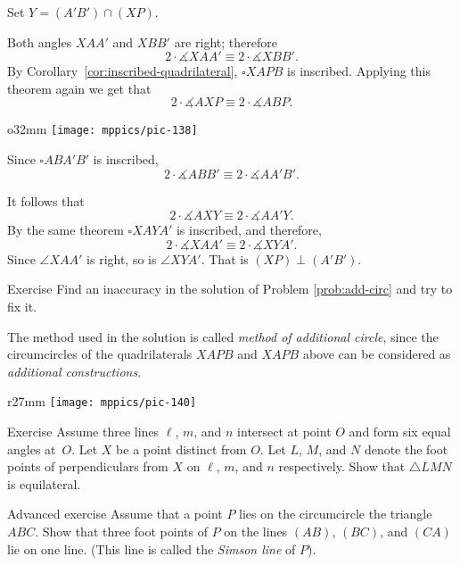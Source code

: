 Set $Y=(A'B')\cap (XP)$.

Both angles $XAA'$ and $XBB'$ are right;
therefore
\[2\cdot\measuredangle XAA'
\equiv
2\cdot\measuredangle XBB'.\]
By Corollary~\ref{cor:inscribed-quadrilateral},  $\square XAPB$ is inscribed.
Applying this theorem again we get that
\[2\cdot\measuredangle AXP
\equiv
2\cdot\measuredangle ABP.\]

\begin{wrapfigure}[9]{o}{32mm}
\vskip-7mm
\centering
\texttt{[image: mppics/pic-138]}
\end{wrapfigure}

Since $\square ABA'B'$ is inscribed, 
\[2\cdot\measuredangle ABB'
\equiv
2\cdot\measuredangle AA'B'.\]

It follows that 
\[2\cdot\measuredangle AXY
\equiv
2\cdot\measuredangle AA'Y.\]
By the same theorem $\square XAYA'$ is inscribed,
and
therefore, 
\[2\cdot\measuredangle XAA'
\equiv
2\cdot\measuredangle XYA'.\]
Since $\angle XAA'$ is right, 
so is $\angle XYA'$. 
That is $(XP)\perp(A'B')$.
\qeds

\begin{thm}{Exercise}\label{ex:inaccuracy}
Find an inaccuracy in the solution of Problem \ref{prob:add-circ} and try to fix it.
\end{thm}

The method used in the solution 
is called {}\emph{method of additional circle},
since the circumcircles of the quadrilaterals $XAPB$ and $XAPB$ 
 above can be considered as {}\emph{additional constructions}. 

{

\begin{wrapfigure}{r}{27mm}
\vskip-8mm
\centering
\texttt{[image: mppics/pic-140]}
\end{wrapfigure}

\begin{thm}{Exercise}\label{ex:equilateral-2}
Assume three lines $\ell$, $m$, and $n$ intersect at point $O$ and form six equal angles at~$O$. 
Let $X$ be a point distinct from $O$.
Let $L$, $M$, and $N$ denote the foot points of perpendiculars from $X$ on $\ell$, $m$, and $n$ respectively.
Show that $\triangle LMN$ is equilateral.
\end{thm}
}

\begin{thm}{Advanced exercise}\label{ex:simson}
Assume that a point $P$ lies on the circumcircle the triangle $ABC$.
Show that three foot points of $P$ on the lines $(AB)$, $(BC)$, and $(CA)$ lie on one line.
(This line is called the \emph{Simson line} of $P$).
\end{thm}

